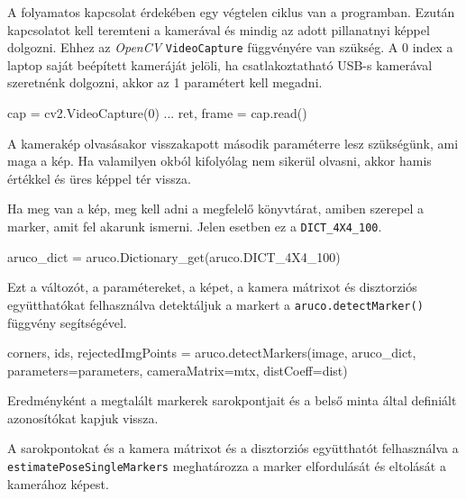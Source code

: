 A folyamatos kapcsolat érdekében egy végtelen ciklus van a programban.
Ezután kapcsolatot kell teremteni a kamerával és mindig az adott pillanatnyi képpel dolgozni.
Ehhez az \textit{OpenCV} \texttt{VideoCapture} függvényére van szükség. A 0 index a laptop saját beépített kameráját jelöli, ha csatlakoztatható USB-s kamerával szeretnénk dolgozni, akkor az 1 paramétert kell megadni.
\begin{python}
cap = cv2.VideoCapture(0)
...
ret, frame = cap.read()
\end{python}
A kamerakép olvasásakor visszakapott második paraméterre lesz szükségünk, ami maga a kép. Ha valamilyen okból kifolyólag nem sikerül olvasni, akkor hamis értékkel és üres képpel tér vissza.

Ha meg van a kép, meg kell adni a megfelelő könyvtárat, amiben szerepel a marker, amit fel akarunk ismerni. Jelen esetben ez a \texttt{DICT\_4X4\_100}.
\begin{python}
aruco_dict = aruco.Dictionary_get(aruco.DICT_4X4_100)
\end{python}
Ezt a változót, a paramétereket, a képet, a kamera mátrixot és disztorziós együtthatókat felhasználva detektáljuk a markert a \texttt{aruco.detectMarker()} függvény segítségével.
\begin{python}
corners, ids, rejectedImgPoints = aruco.detectMarkers(image, aruco_dict,
parameters=parameters,
cameraMatrix=mtx,
distCoeff=dist)
\end{python}
Eredményként a megtalált markerek sarokpontjait és a belső minta által definiált azonosítókat kapjuk vissza.

A sarokpontokat és a kamera mátrixot és a disztorziós együtthatót felhasználva a
\texttt{estimatePoseSingleMarkers} meghatározza a marker elfordulását és eltolását a kamerához képest.

